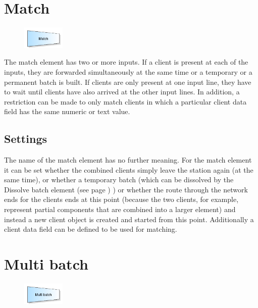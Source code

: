 \section{Match}
\label{ref:ModelElementMatch}

\begin{figure}
\vspace{-22pt}
\includegraphics[width=2cm]{imageModelElementMatch.png}
\vspace{-22pt}
\end{figure}

The match element has two or more inputs. If a client is present at each of the inputs, they are forwarded simultaneously
at the same time or a temporary or a permanent batch is built. If clients are only present at one input line, they have
to wait until clients have also arrived at the other input lines.
In addition, a restriction can be made to only match clients in which a particular client data field has the same
numeric or text value.

\subsection*{Settings}

The name of the match element has no further meaning. For the match element it can be set whether the combined
clients simply leave the station again (at the same time), or whether a temporary batch (which
can be dissolved by the Dissolve batch element (see page \pageref{ref:ModelElementSeparate}) ) or whether the route
through the network ends for the clients ends at this point (because the two clients, for example, represent
partial components that are combined into a larger element) and instead a new client object is created and
started from this point. Additionally a client data field can be defined to be used for matching.


\section{Multi batch}
\label{ref:ModelElementBatchMulti}

\begin{figure}
\vspace{-22pt}
\includegraphics[width=2cm]{imageModelElementBatchMulti.png}
\vspace{-22pt}
\end{figure}

